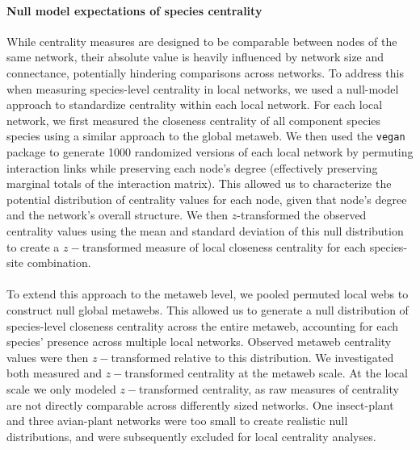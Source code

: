 \documentclass[12pt]{article}
\begin{document}

\paragraph*{Null model expectations of species centrality} 
While centrality measures are designed to be comparable between nodes of the same network, their absolute value is heavily influenced by network size and connectance, potentially hindering comparisons across networks. To address this when measuring species-level centrality in local networks, we used a null-model approach to standardize centrality within each local network. For each local network, we first measured the closeness centrality of all component species species using a similar approach to the global metaweb.
We then used the \texttt{vegan} package to generate 1000 randomized versions of each local network by permuting interaction links while preserving each node's degree (effectively preserving marginal totals of the interaction matrix). This allowed us to characterize the potential distribution of centrality values for each node, given that node's degree and the network's overall structure. We then $z$-transformed the observed centrality values using the mean and standard deviation of this null distribution to create a $z-$transformed measure of local closeness centrality for each species-site combination. 


\paragraph{} To extend this approach to the metaweb level, we pooled permuted local webs to construct null global metawebs. This allowed us to generate a null distribution of species-level closeness centrality across the entire metaweb, accounting for each species' presence across multiple local networks. Observed metaweb centrality values were then $z-$transformed relative to this distribution. We investigated both measured and $z-$transformed centrality at the metaweb scale. At the local scale we only modeled $z-$transformed centrality, as raw measures of centrality are not directly comparable across differently sized networks. One insect-plant and three avian-plant networks were too small to create realistic null distributions, and were subsequently excluded for local centrality analyses. 
\end{document}
